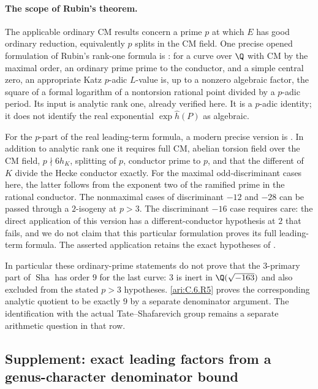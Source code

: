\paragraph{The scope of Rubin's theorem.}
The applicable ordinary CM results concern a prime $p$ at which
$E$ has good ordinary reduction, equivalently $p$ splits in the CM
field. One precise opened formulation of Rubin's rank-one formula
is \citet[Theorem 1]{CrBDP2012}: for a curve over $\Q$ with CM
by the maximal order, an ordinary prime prime to the conductor,
and a simple central zero, an appropriate Katz $p$-adic $L$-value
is, up to a nonzero algebraic factor, the square of a formal
logarithm of a nontorsion rational point divided by a $p$-adic
period. Its input is analytic rank one, already verified here.
It is a $p$-adic identity; it does not identify the real exponential
$\exp\widehat h(P)$ as algebraic.

For the $p$-part of the real leading-term formula, a modern precise
version is \citet[Theorem~A]{CrCastella2025}. In addition to analytic
rank one it requires full CM, abelian torsion field over the CM
field, $p\nmid6h_K$, splitting of $p$, conductor prime to $p$,
and that the different of $K$ divide the Hecke conductor exactly.
For the maximal odd-discriminant cases here, the latter follows
from the exponent two of the ramified prime in the rational
conductor. The nonmaximal cases of discriminant $-12$ and $-28$
can be passed through a $2$-isogeny at $p>3$. The discriminant
$-16$ case requires care: the direct application of this version
has a different-conductor hypothesis at $2$ that fails, and we
do not claim that this particular formulation proves its full
leading-term formula. The asserted application retains the exact hypotheses of
\citet[Theorem~A]{CrCastella2025}.

In particular these ordinary-prime statements do not prove that
the $3$-primary part of $\operatorname{Sha}$ has order $9$ for the
last curve: $3$ is inert in $\Q(\sqrt{-163})$ and also excluded
from the stated $p>3$ hypotheses. \ref{ari:C.6.R5} proves the corresponding
analytic quotient to be exactly $9$ by a separate denominator
argument. The identification with the actual Tate--Shafarevich
group remains a separate arithmetic question in that row.


\subsection{Supplement: exact leading factors from a genus-character denominator bound}

